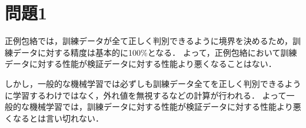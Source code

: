 \section*{問題1}
正例包絡では，訓練データが全て正しく判別できるように境界を決めるため，訓練データに対する精度は基本的に100\%となる．
よって，正例包絡において訓練データに対する性能が検証データに対する性能より悪くなることはない．

しかし，一般的な機械学習では必ずしも訓練データ全てを正しく判別できるように学習するわけではなく，外れ値を無視するなどの計算が行われる．
よって一般的な機械学習では，訓練データに対する性能が検証データに対する性能より悪くなるとは言い切れない．